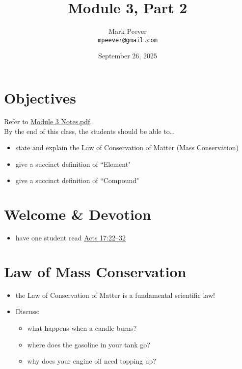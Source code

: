 \documentclass[10pt, oneside]{article}   	%
\title{Module 3, Part 2}
\author{Mark Peever\\ \texttt{mpeever@gmail.com}}
\date{September 26, 2025}
\begin{document}
\maketitle

\section*{Objectives}
Refer to \href{https://drive.google.com/file/d/1a59ZMchwsvZDRRW7-2GuTrvZKAS8EWCE/view?usp=sharing}{Module 3 Notes.pdf}.\\


By the end of this class, the students should be able to\ldots
\begin{itemize}
\item state and explain the Law of Conservation of Matter (Mass Conservation)
\item give a succinct definition of ``Element"
\item give a succinct definition of ``Compound"

\end{itemize}

\section*{Welcome \& Devotion}
\begin{itemize}
\item have one student read \href{https://tinyurl.com/26k8csmf}{Acts 17:22–32}
\end{itemize}

\section*{Law of Mass Conservation}
\begin{itemize}
\item the Law of Conservation of Matter is a fundamental scientific law!
\item Discuss:
\begin{itemize}
\item what happens when a candle burns?
\item where does the gasoline in your tank go?
\item why does your engine oil need topping up?
\end{itemize} 
\end{itemize}
\end{document}
